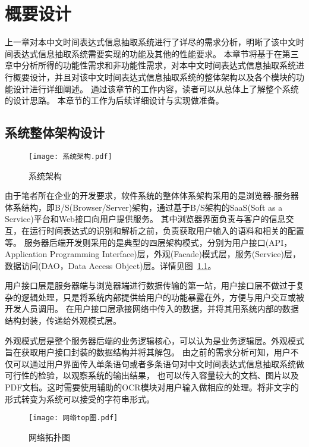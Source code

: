 

\chapter{概要设计}

上一章对本中文时间表达式信息抽取系统进行了详尽的需求分析，明晰了该中文时间表达式信息抽取系统需要实现的功能及其他的性能要求。
本章节将基于在第三章中分析所得的功能性需求和非功能性需求，对本中文时间表达式信息抽取系统进行概要设计，并且对该中文时间表达式信息抽取系统的整体架构以及各个模块的功能设计进行详细阐述。
通过该章节的工作内容，读者可以从总体上了解整个系统的设计思路。
本章节的工作为后续详细设计与实现做准备。

\section{系统整体架构设计}

\begin{figure}[h]
  \centering
  \texttt{[image: 系统架构.pdf]}
  \caption{系统架构}
  \label{fig:architect}
\end{figure}

由于笔者所在企业的开发要求，软件系统的整体体系架构采用的是浏览器-服务器体系结构，即B/S(Browser/Server)架构，通过基于B/S架构的SaaS(Soft as a Service)平台和Web接口向用户提供服务。
其中浏览器界面负责与客户的信息交互，在运行时间表达式的识别和解析之前，负责获取用户输入的语料和相关的配置等。
服务器后端开发则采用的是典型的四层架构模式，分别为用户接口(API，Application Programming Interface)层，外观(Facade)模式层，服务(Service)层，数据访问(DAO，Data Access Object)层。详情见图~\ref{fig:architect}。

用户接口层是服务器端与浏览器端进行数据传输的第一站，用户接口层不做过于复杂的逻辑处理，只是将系统内部提供给用户的功能暴露在外，方便与用户交互或被开发人员调用。
在用户接口层承接网络中传入的数据，并将其用系统内部的数据结构封装，传递给外观模式层。

外观模式层是整个服务器后端的业务逻辑核心，可以认为是业务逻辑层。外观模式旨在获取用户接口封装的数据结构并将其解包。
由之前的需求分析可知，用户不仅可以通过用户界面传入单条语句或者多条语句对中文时间表达式信息抽取系统做可行性的检验，以观察系统的输出结果，
也可以传入容量较大的文档、图片以及PDF文档。这时需要使用辅助的OCR模块对用户输入做相应的处理。将非文字的形式转变为系统可以接受的字符串形式。

\begin{figure}[h]
  \centering
  \texttt{[image: 网络top图.pdf]}
  \caption{网络拓扑图}
  \label{fig:network_top}
\end{figure}

